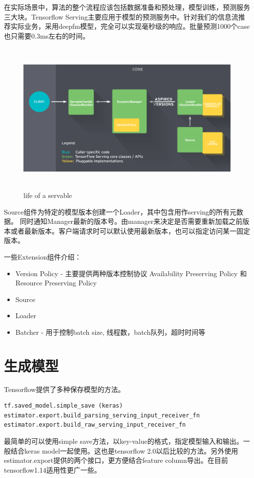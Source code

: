 \documentclass[12pt,a4paper,oneside]{article}
\begin{document}
\begin{CJK*}{UTF8}{gbsn}
在实际场景中，算法的整个流程应该包括数据准备和预处理，模型训练，预测服务三大块。Tensorflow Serving主要应用于模型的预测服务中。针对我们的信息流推荐实际业务，采用deepfm模型，完全可以实现毫秒级的响应。批量预测1000个case也只需要0.3ms左右的时间。


\begin{figure}[H]
\centering
\includegraphics[width=6in,height=3in]{lifeofservable}
\caption{life of a servable}
\end{figure}
Source组件为特定的模型版本创建一个Loader，其中包含用作serving的所有元数据。 同时通知Manager最新的版本号。由manager来决定是否需要重新加载之前版本或者最新版本。客户端请求时可以默认使用最新版本，也可以指定访问某一固定版本。

一些Extension组件介绍：
\begin{itemize}
\item Version Policy
- 主要提供两种版本控制协议 Availability Preserving Policy 和 Resource Preserving Policy
\item Source 
\item Loader
\item Batcher
- 用于控制batch size, 线程数，batch队列，超时时间等
\end{itemize}


\section{生成模型}
Tensorflow提供了多种保存模型的方法。

\begin{lstlisting}
tf.saved_model.simple_save (keras)
estimator.export.build_parsing_serving_input_receiver_fn
estimator.export.build_raw_serving_input_receiver_fn
\end{lstlisting}

最简单的可以使用simple save方法，以key-value的格式，指定模型输入和输出。一般结合keras model一起使用。这也是tensorflow 2.0以后比较的方法。另外使用estimator.export提供的两个接口，更方便结合feature column导出。在目前tensorflow1.14适用性更广一些。


\end{CJK*}
\end{document}
